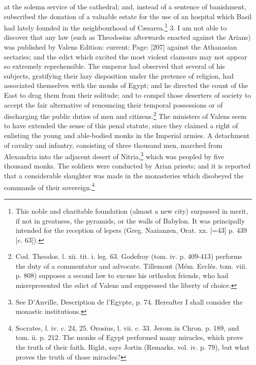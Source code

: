 at the solemn service of the cathedral; and, instead of a sentence of banishment, subscribed the donation of a valuable estate for the use of an hospital which Basil had lately founded in the neighbourhood of Cæsarea.\footnote{This noble and charitable foundation (almost a new city) surpassed in merit, if not in greatness, the pyramids, or the walls of Babylon. It was principally intended for the reception of lepers (Greg. Nazianzen, Orat. xx. [=43] p. 439 [c. 63]).} 3. I am not able to discover that any law (such as Theodosius afterwards enacted against the Arians) was published by Valens Edition: current; Page: [207] against the Athanasian sectaries; and the edict which excited the most violent clamours may not appear so extremely reprehensible. The emperor had observed that several of his subjects, gratifying their lazy disposition under the pretence of religion, had associated themselves with the monks of Egypt; and he directed the count of the East to drag them from their solitude; and to compel those deserters of society to accept the fair alternative of renouncing their temporal possessions or of discharging the public duties of men and citizens.\footnote{Cod. Theodos. l. xii. tit. i. leg. 63. Godefroy (tom. iv. p. 409-413) performs the duty of a commentator and advocate. Tillemont (Mém. Ecclés. tom. viii. p. 808) supposes a second law to excuse his orthodox friends, who had misrepresented the edict of Valens and suppressed the liberty of choice.} The ministers of Valens seem to have extended the sense of this penal statute, since they claimed a right of enlisting the young and able-bodied monks in the Imperial armies. A detachment of cavalry and infantry, consisting of three thousand men, marched from Alexandria into the adjacent desert of Nitria,\footnote{See D\texthebrew{}’Anville, Description de l\texthebrew{}’Egypte, p. 74. Hereafter I shall consider the monastic institutions.} which was peopled by five thousand monks. The soldiers were conducted by Arian priests; and it is reported that a considerable slaughter was made in the monasteries which disobeyed the commands of their sovereign.\footnote{Socrates, l. iv. c. 24, 25. Orosius, l. vii. c. 33. Jerom in Chron. p. 189, and tom. ii. p. 212. The monks of Egypt performed many miracles, which prove the truth of their faith. Right, says Jortin (Remarks, vol. iv. p. 79), but what proves the truth of those miracles?}

